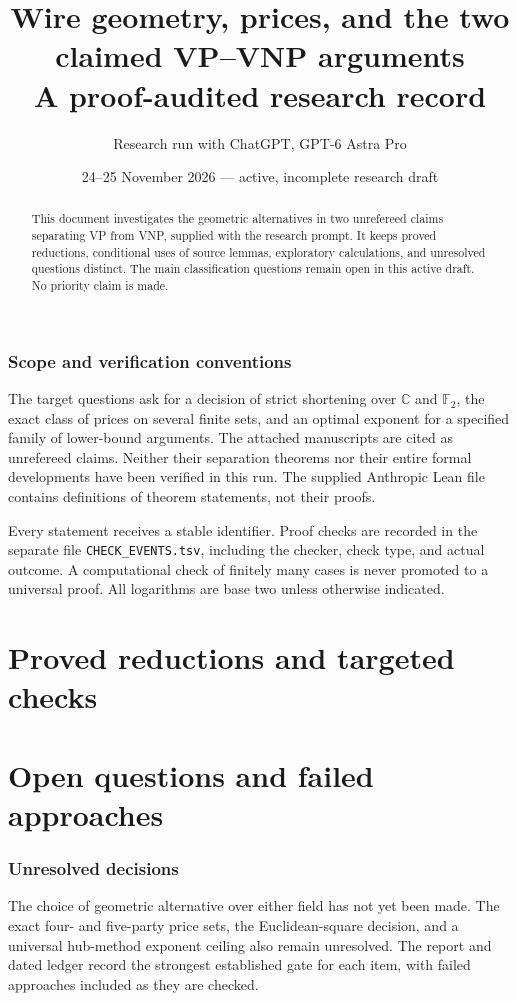 \documentclass[11pt,a4paper]{article}
\title{Wire geometry, prices, and the two claimed VP--VNP arguments\\
\large A proof-audited research record}
\author{Research run with ChatGPT, GPT-6 Astra Pro}
\date{24--25 November 2026 --- active, incomplete research draft}
\theoremstyle{definition}\newtheorem{definition}[theorem]{Definition}
\theoremstyle{remark}\newtheorem{remark}[theorem]{Remark}
\begin{document}
\maketitle
\begin{abstract}
This document investigates the geometric alternatives in two unrefereed
claims separating VP from VNP, supplied with the research prompt. It keeps
proved reductions, conditional uses of source lemmas, exploratory
calculations, and unresolved questions distinct. The main classification
questions remain open in this active draft. No priority claim is made.
\end{abstract}
\tableofcontents
\section{Scope and verification conventions}
The target questions ask for a decision of strict shortening over
$\mathbb C$ and $\mathbb F_2$, the exact class of prices on several finite
sets, and an optimal exponent for a specified family of lower-bound
arguments. The attached manuscripts are cited as unrefereed claims.
Neither their separation theorems nor their entire formal developments
have been verified in this run. The supplied Anthropic Lean file contains
definitions of theorem statements, not their proofs.

Every statement receives a stable identifier. Proof checks are recorded
in the separate file \texttt{CHECK\_EVENTS.tsv}, including the checker,
check type, and actual outcome. A computational check of finitely many
cases is never promoted to a universal proof. All logarithms are base two
unless otherwise indicated.

\part{Proved reductions and targeted checks}


\part{Open questions and failed approaches}
\section{Unresolved decisions}
The choice of geometric alternative over either field has not yet been
made. The exact four- and five-party price sets, the Euclidean-square
decision, and a universal hub-method exponent ceiling also remain
unresolved. The report and dated ledger record the strongest established
gate for each item, with failed approaches included as they are checked.

\end{document}
